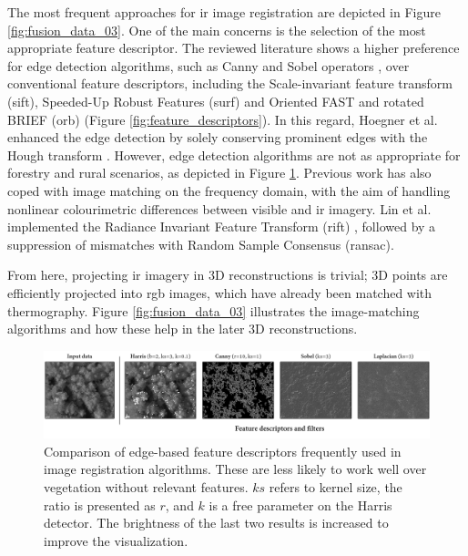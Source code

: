 The most frequent approaches for \acrshort{ir} image registration are depicted in Figure \ref{fig:fusion_data_03}. One of the main concerns is the selection of the most appropriate feature descriptor. The reviewed literature shows a higher preference for edge detection algorithms, such as Canny and Sobel operators \cite{hoegner_3d_2016, hoegner_evaluation_2016}, over conventional feature descriptors, including the Scale-invariant feature transform (\acrshort{sift}), Speeded-Up Robust Features (\acrshort{surf}) and Oriented FAST and rotated BRIEF (\acrshort{orb}) (Figure \ref{fig:feature_descriptors}). In this regard, Hoegner et al. \cite{hoegner_evaluation_2016} enhanced the edge detection by solely conserving prominent edges with the Hough transform \cite{hoegner_evaluation_2016}. However, edge detection algorithms are not as appropriate for forestry and rural scenarios, as depicted in Figure \ref{fig:feature_detection}. Previous work has also coped with image matching on the frequency domain, with the aim of handling nonlinear colourimetric differences between visible and \acrshort{ir} imagery. Lin et al. \cite{lin_fusion_2019} implemented the Radiance Invariant Feature Transform (\acrshort{rift}) \cite{lin_fusion_2019}, followed by a suppression of mismatches with Random Sample Consensus (\acrshort{ransac}).

From here, projecting \acrshort{ir} imagery in 3D reconstructions is trivial; 3D points are efficiently projected into \acrshort{rgb} images, which have already been matched with thermography. Figure \ref{fig:fusion_data_03} illustrates the image-matching algorithms and how these help in the later 3D reconstructions. 

\begin{figure}[ht]
	\includegraphics[width=\linewidth]{figs/context/feature_detection.png}
	\caption{Comparison of edge-based feature descriptors frequently used in image registration algorithms. These are less likely to work well over vegetation without relevant features. $\textit{ks}$ refers to kernel size, the ratio is presented as $\textit{r}$, and $\textit{k}$ is a free parameter on the Harris detector. The brightness of the last two results is increased to improve the visualization.}
    \label{fig:feature_detection}
\end{figure}

